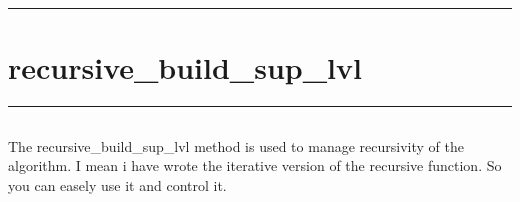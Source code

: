 \documentclass[letterpaper,10pt,english]{sphinxmanual}
\begin{document}
\bigskip\hrule\bigskip



\subsection{}
\label{\detokenize{recursive_build_sup_lvl_safe_mode:source-code}}
\begin{sphinxVerbatim}[commandchars=\\\{\}]
  \PYG{p}{[}\PYG{p}{]}
   
 
\end{sphinxVerbatim}

\newpage
\section{recursive\_build\_sup\_lvl}
\label{\detokenize{recursive_build_sup_lvl:recursive-build-sup-lvl}}\label{\detokenize{recursive_build_sup_lvl::doc}}
\begin{sphinxVerbatim}[commandchars=\\\{\}]
 
\end{sphinxVerbatim}


\bigskip\hrule\bigskip



\subsection{}
\label{\detokenize{recursive_build_sup_lvl:algorithm}}
\sphinxAtStartPar
The recursive\_build\_sup\_lvl method is used to manage recursivity of the algorithm.
I mean i have wrote the iterative version of the recursive function. So you can easely use it and control it.
\end{document}
